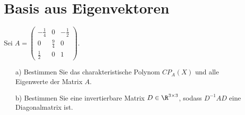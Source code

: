 \newpage

\section{Basis aus Eigenvektoren}
Sei $A=\begin{pmatrix} -\frac{1}{4} & 0 & -\frac{1}{2} \\ 0 & \frac{9}{4} & 0 \\ \frac{1}{2} & 0 &1 \end{pmatrix}$. 
\begin{itemize}
\item[a)] Bestimmen Sie das charakteristische Polynom $CP_A(X)$ und alle Eigenwerte der Matrix $A$.
\item[b)] Bestimmen Sie eine invertierbare Matrix $D \in \R^{3 \times 3}$, sodass $D^{-1}AD$ eine Diagonalmatrix ist.
\end{itemize}


